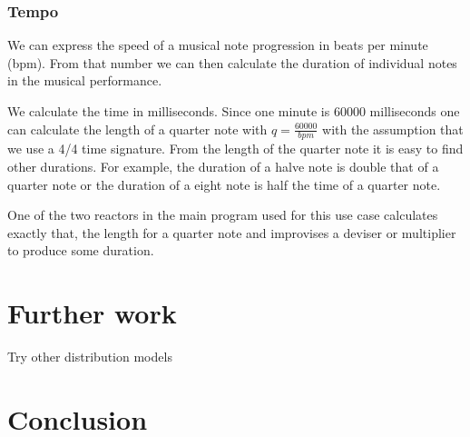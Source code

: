 \documentclass[a4paper]{book}
\begin{document}
\subsection*{Tempo}
We can express the speed of a musical note progression in beats per minute (bpm). From that number we can then calculate the duration of individual notes in the musical performance. 

We calculate the time in milliseconds. Since one minute is 60000 milliseconds one can calculate the length of a quarter note with \(q = \frac{60000}{bpm}\) with the assumption that we use a 4/4 time signature. From the length of the quarter note it is easy to find other durations. For example, the duration of a halve note is double that of a quarter note or the duration of a eight note is half the time of a quarter note.

One of the two reactors in the main program used for this use case calculates exactly that, the length for a quarter note and improvises a deviser or multiplier to produce some duration. 


\backmatter
\chapter{Further work}
Try other distribution models


\chapter{Conclusion}


\printbibliography
\end{document}

